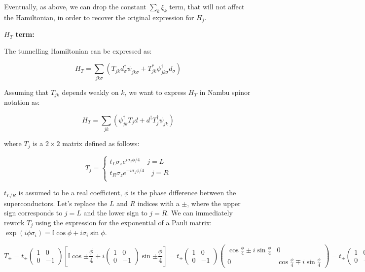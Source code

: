 Eventually, as above, we can drop the constant \(\sum_k \xi_k\) term,
that will not affect the Hamiltonian, in order to recover the original
expression for \(H_j\).

\textbf{\(H_T\) term:}

The tunnelling Hamiltonian can be expressed as:

\[ H_T = \sum_{jk\sigma} \left( T_{jk} d_\sigma^\dagger \psi_{jk\sigma}+T_{jk}^* \psi_{jk\sigma}^\dagger d_\sigma\right)\]

Assuming that \(T_{jk}\) depends weakly on \(k\), we want to express
\(H_T\) in Nambu spinor notation as:

\[ H_T = \sum_{jk} \left(\psi_{jk}^\dagger T_j d + d^\dagger T_j^\dagger \psi_{jk} \right)\]

where \(T_j\) is a \(2\times 2\) matrix defined as follows:

\[T_j =\left\{
                \begin{array}{ll}
                  t_L \sigma_z e^{i \sigma_z \phi/4} \quad j = L \\
                  t_R \sigma_z e^{-i \sigma_z \phi / 4} \quad j = R \\
                \end{array}
              \right. 
\]

\(t_{L / R}\) is assumed to be a real coefficient, \(\phi\) is the phase
difference between the superconductors. Let's replace the \(L\) and
\(R\) indices with a \(\pm\), where the upper sign corresponds to
\(j=L\) and the lower sign to \(j=R\). We can immediately rework \(T_j\)
using the expression for the exponential of a Pauli matrix:
\(\exp(i \phi \sigma_i) = \mathbb{I}\cos{\phi}+i \sigma_i \sin{\phi}\).

\[ T_\pm = t_\pm \begin{pmatrix}1 & 0 \\ 0 & -1\end{pmatrix}\left[\mathbb{I}\cos{\pm \frac{\phi}{4}}+i\begin{pmatrix}1 & 0 \\ 0 & -1\end{pmatrix}\sin{\pm \frac{\phi}{4}} \right] = t_\pm \begin{pmatrix}1 & 0 \\ 0 & -1\end{pmatrix} \begin{pmatrix}\cos{\frac{\phi}{4}}\pm i\sin{\frac{\phi}{4}} & 0 \\
0 & \cos{\frac{\phi}{4}}\mp i \sin{\frac{\phi}{4}}\end{pmatrix} = t_\pm \begin{pmatrix}1 & 0 \\ 0 & -1\end{pmatrix} \begin{pmatrix} e^{\pm i \frac{\phi}{4}} & 0 \\
0 & e^{\mp i \frac{\phi}{4}}\end{pmatrix}\]

